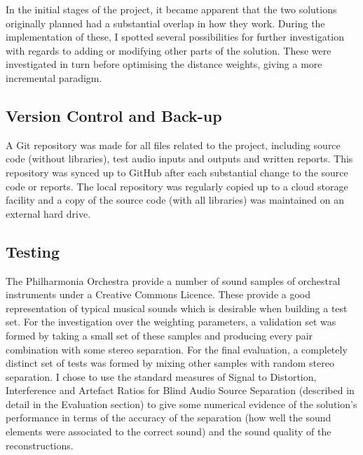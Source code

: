 \documentclass[12pt,a4paper,twoside,openright]{report}
\begin{document}
In the initial stages of the project, it became apparent that the two solutions originally planned had a substantial overlap in how they work. During the implementation of these, I spotted several possibilities for further investigation with regards to adding or modifying other parts of the solution. These were investigated in turn before optimising the distance weights, giving a more incremental paradigm.

\subsection{Version Control and Back-up}

A Git repository was made for all files related to the project, including source code (without libraries), test audio inputs and outputs and written reports. This repository was synced up to GitHub after each substantial change to the source code or reports. The local repository was regularly copied up to a cloud storage facility and a copy of the source code (with all libraries) was maintained on an external hard drive.

\subsection{Testing}

The Philharmonia Orchestra provide a number of sound samples \cite{philharmonia} of orchestral instruments under a Creative Commons Licence. These provide a good representation of typical musical sounds which is desirable when building a test set. For the investigation over the weighting parameters, a validation set was formed by taking a small set of these samples and producing every pair combination with some stereo separation. For the final evaluation, a completely distinct set of tests was formed by mixing other samples with random stereo separation. I chose to use the standard measures of Signal to Distortion, Interference and Artefact Ratios for Blind Audio Source Separation (described in detail in the Evaluation section) to give some numerical evidence of the solution's performance in terms of the accuracy of the separation (how well the sound elements were associated to the correct sound) and the sound quality of the reconstructions.

\end{document}
